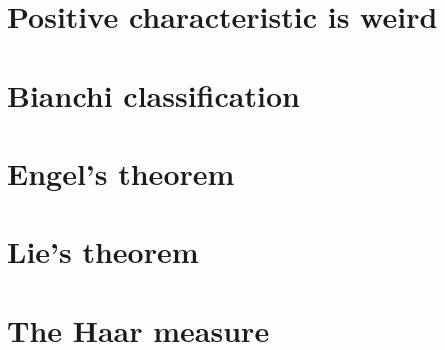\documentclass [11 pt, oneside] {article}
\begin{document}
\section {Positive characteristic is weird}

\section {Bianchi classification}

\section {Engel's theorem}

\section {Lie's theorem}

\section {The Haar measure}
\fi

\printindex
\end{document}
